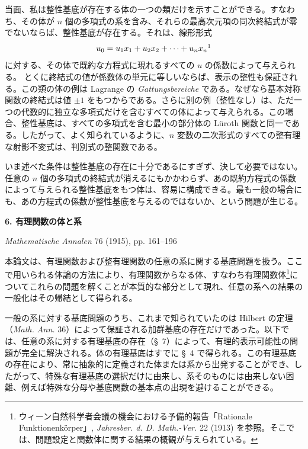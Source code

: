 \documentclass[11pt]{jlreq}
\begin{document}
当面、私は整性基底が存在する体の一つの類だけを示すことができる。すなわち、その体が $n$ 個の多項式の系を含み、それらの最高次元項の同次終結式が零でないならば、整性基底が存在する。それは、線形形式
\[
  u_0=u_1x_1+u_2x_2+\cdots+u_nx_n\footnotemark
\]
に対する、その体で既約な方程式に現れるすべての $u$ の係数によって与えられる。
とくに終結式の値が係数体の単元に等しいならば、表示の整性も保証される。この類の体の例は Lagrange の \emph{Gattungsbereiche} である。なぜなら基本対称関数の終結式は値 $\pm 1$ をもつからである。さらに別の例（整性なし）は、ただ一つの代数的に独立な多項式だけを含むすべての体によって与えられる。この場合、整性基底は、すべての多項式を含む最小の部分体の Lüroth 関数と同一である。したがって、よく知られているように、$n$ 変数の二次形式のすべての整有理な射影不変式は、判別式の整関数である。

いま述べた条件は整性基底の存在に十分であるにすぎず、決して必要ではない。任意の $n$ 個の多項式の終結式が消えるにもかかわらず、あの既約方程式の係数によって与えられる整性基底をもつ体は、容易に構成できる。最も一般の場合にも、あの方程式の係数が整性基底を与えるのではないか、という問題が生じる。

\clearpage

\begin{center}
{\Large\bfseries 6. 有理関数の体と系}\par
\vspace{1.2em}
\emph{Mathematische Annalen} 76 (1915), pp. 161--196
\end{center}

\vspace{1.5em}

本論文は、有理関数および整有理関数の任意の系に関する基底問題を扱う。ここで用いられる体論の方法により、有理関数からなる体、すなわち有理関数体\footnote{ウィーン自然科学者会議の機会における予備的報告「Rationale Funktionenkörper」, \emph{Jahresber. d. D. Math.-Ver.} 22 (1913) を参照。そこでは、問題設定と関数体に関する結果の概観が与えられている。}についてこれらの問題を解くことが本質的な部分として現れ、任意の系への結果の一般化はその帰結として得られる。

一般の系に対する基底問題のうち、これまで知られていたのは Hilbert の定理（\emph{Math. Ann.} 36）によって保証される加群基底の存在だけであった。以下では、任意の系に対する有理基底の存在（\S\ 7）によって、有理的表示可能性の問題が完全に解決される。体の有理基底はすでに \S\ 4 で得られる。この有理基底の存在により、常に抽象的に定義された体または系から出発することができ、したがって、特殊な有理基底の選択だけに由来し、系そのものには由来しない困難、例えば特殊な分母や基底関数の基本点の出現を避けることができる。
\end{document}
